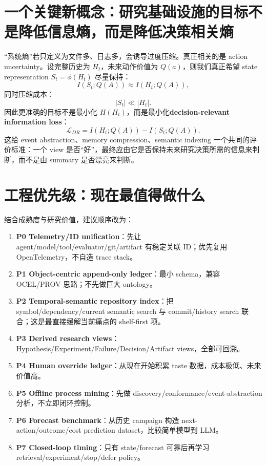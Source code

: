 \documentclass[11pt,a4paper]{ctexart}
\begin{document}
\section{一个关键新概念：研究基础设施的目标不是降低信息熵，而是降低决策相关熵}

“系统熵”若只定义为文件多、日志多，会诱导过度压缩。真正相关的是 action uncertainty。设完整历史为 $H_t$，未来动作价值为 $Q(a)$，则我们真正希望 state representation $S_t=\phi(H_t)$ 尽量保持：
\begin{equation}
I(S_t;Q(A))\approx I(H_t;Q(A)),
\end{equation}
同时压缩成本：
\begin{equation}
|S_t|\ll |H_t|.
\end{equation}
因此更准确的目标不是最小化 $H(H_t)$，而是最小化\textbf{decision-relevant information loss}：
\begin{equation}
\mathcal L_{DR}=I(H_t;Q(A))-I(S_t;Q(A)).
\end{equation}
这给 event abstraction、memory compression、semantic indexing 一个共同的评价标准：一个 view 是否“好”，最终应由它是否保持未来研究决策所需的信息来判断，而不是由 summary 是否漂亮来判断。

\section{工程优先级：现在最值得做什么}

结合成熟度与研究价值，建议顺序改为：
\begin{enumerate}
 \item \textbf{P0 Telemetry/ID unification}：先让 agent/model/tool/evaluator/git/artifact 有稳定关联 ID；优先复用 OpenTelemetry，不自造 trace stack。
 \item \textbf{P1 Object-centric append-only ledger}：最小 schema，兼容 OCEL/PROV 思路；不先做巨大 ontology。
 \item \textbf{P2 Temporal-semantic repository index}：把 symbol/dependency/current semantic search 与 commit/history search 联合；这是最直接缓解当前痛点的 shelf-first 项。
 \item \textbf{P3 Derived research views}：Hypothesis/Experiment/Failure/Decision/Artifact views，全部可回溯。
 \item \textbf{P4 Human override ledger}：从现在开始积累 taste 数据，成本极低、未来价值高。
 \item \textbf{P5 Offline process mining}：先做 discovery/conformance/event-abstraction 分析，不立即闭环控制。
 \item \textbf{P6 Forecast benchmark}：从历史 campaign 构造 next-action/outcome/cost prediction dataset，比较简单模型到 LLM。
 \item \textbf{P7 Closed-loop timing}：只有 state/forecast 可靠后再学习 retrieval/experiment/stop/defer policy。
\end{enumerate}
\end{document}
